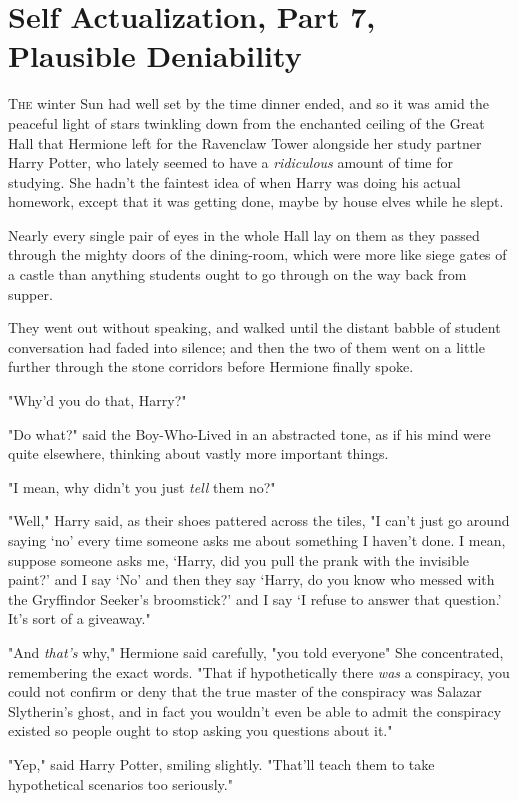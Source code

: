 \chapter{Self Actualization, Part 7, Plausible Deniability}

\lettrine{T}{he} winter Sun
had well set by the time dinner ended, and so it was amid the peaceful light of
stars twinkling down from the enchanted ceiling of the Great Hall that Hermione
left for the Ravenclaw Tower alongside her study partner Harry Potter, who
lately seemed to have a \emph{ridiculous} amount of time for studying. She
hadn't the faintest idea of when Harry was doing his actual homework, except
that it was getting done, maybe by house elves while he slept.

Nearly every single pair of eyes in the whole Hall lay on them as they passed
through the mighty doors of the dining-room, which were more like siege gates
of a castle than anything students ought to go through on the way back from
supper.

They went out without speaking, and walked until the distant babble of student
conversation had faded into silence; and then the two of them went on a little
further through the stone corridors before Hermione finally spoke.

"Why'd you do that, Harry?"

"Do what?" said the Boy-Who-Lived in an abstracted tone, as if his mind were
quite elsewhere, thinking about vastly more important things.

"I mean, why didn't you just \emph{tell} them no?"

"Well," Harry said, as their shoes pattered across the tiles, "I can't just go
around saying `no' every time someone asks me about something I haven't done. I
mean, suppose someone asks me, `Harry, did you pull the prank with the
invisible paint?' and I say `No' and then they say `Harry, do you know who
messed with the Gryffindor Seeker's broomstick?' and I say `I refuse to answer
that question.' It's sort of a giveaway."

"And \emph{that's} why," Hermione said carefully, "you told everyone{\el}"
She concentrated, remembering the exact words. "That if hypothetically there
\emph{was} a conspiracy, you could not confirm or deny that the true master of
the conspiracy was Salazar Slytherin's ghost, and in fact you wouldn't even be
able to admit the conspiracy existed so people ought to stop asking you
questions about it."

"Yep," said Harry Potter, smiling slightly. "That'll teach them to take
hypothetical scenarios too seriously."

